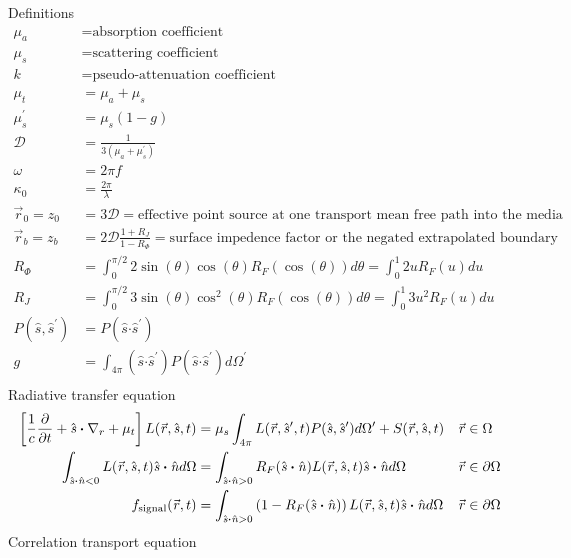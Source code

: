 \documentclass{article}
\newcommand{\diffusion}{\mathcal{D}}
\newcommand{\vdot}{\boldsymbol{\cdot}}
\newcommand{\va}[1]{\vec{\mathit{#1}}}
\newcommand{\vu}[1]{\hat{\mathit{#1}}}
\begin{document}
Definitions
\begin{align*}
    \mu_a &= \text{absorption coefficient} \\
    \mu_s &= \text{scattering coefficient} \\
    k &= \text{pseudo-attenuation coefficient} \\
    \mu_t &= \mu_a + \mu_s \\
    \mu_s^{\prime} &= \mu_s (1 - g) \\
    \diffusion &= \frac{1}{3(\mu_a + \mu_s^{\prime})} \\
    \omega &= 2 \pi f \\
    \kappa_0 &= \frac{2 \pi}{\lambda} \\
    \va{r}_0 = z_0 &= 3 \diffusion = \text{effective point source at one transport mean free path into the media} \\
    \va{r}_b = z_b &= 2 \diffusion \frac{1 + R_J}{1 - R_{\Phi}} = \text{surface impedence factor or the negated extrapolated boundary distance} \\
    R_{\Phi} &= \int_0^{\pi / 2} 2 \sin(\theta) \cos(\theta) R_F(\cos(\theta)) d\theta = \int_0^1 2 u R_F(u) du \\
    R_J &= \int_0^{\pi / 2} 3 \sin(\theta) \cos^2(\theta) R_F(\cos(\theta)) d\theta = \int_0^1 3 u^2 R_F(u) du \\
    P(\vu{s}, \vu{s}^{\prime}) &= P(\vu{s} \vdot \vu{s}^{\prime}) \\
    g &= \int_{4 \pi} (\vu{s} \vdot \vu{s}^{\prime}) P(\vu{s} \vdot \vu{s}^{\prime}) d\Omega^{\prime} \\
\end{align*}
Radiative transfer equation
\begin{align*}
    \left[\frac{1}{c}\diffp{}{t} + \vu{s}\vdot \nabla_{r} + \mu_t\right] L(\va{r}, \vu{s}, t) &=
    \mu_s \int_{4 \pi} L(\va{r}, \vu{s}^{\prime}, t) P(\vu{s}, \vu{s}^{\prime}) d\Omega^{\prime} + S(\va{r}, \vu{s}, t)  &\va{r} &\in \Omega \\
    \int_{\vu{s}\vdot\vu{n}<0} L(\va{r}, \vu{s}, t) \vu{s}\vdot\vu{n} d\Omega &=
    \int_{\vu{s}\vdot\vu{n}>0} R_F(\vu{s}\vdot\vu{n}) L(\va{r}, \vu{s}, t) \vu{s}\vdot\vu{n} d\Omega &\va{r} &\in \partial\Omega \\
    f_{\text{signal}}(\va{r}, t) &= \int_{\vu{s}\vdot\vu{n}>0} \left(1 - R_F(\vu{s}\vdot\vu{n})\right) L(\va{r}, \vu{s}, t) \vu{s}\vdot\vu{n} d\Omega &\va{r} &\in \partial\Omega \\
\end{align*}
Correlation transport equation
\end{document}
